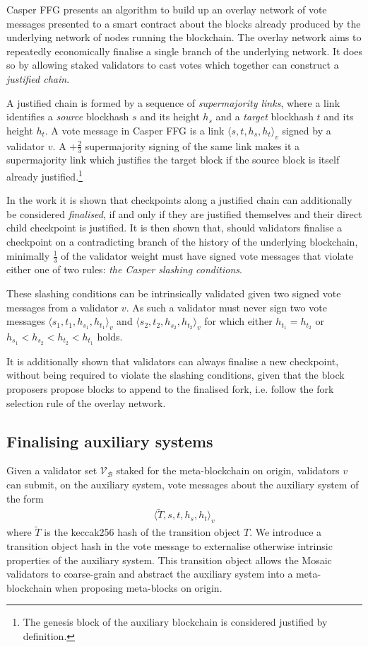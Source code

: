 \documentclass[12pt,a4paper]{article}
\begin{document}
Casper FFG presents an algorithm to build up an overlay network of vote messages presented to a smart contract about the blocks already produced by the underlying network of nodes running the blockchain.
The overlay network aims to repeatedly economically finalise a single branch of the underlying network.
It does so by allowing staked validators to cast votes which together can construct a \emph{justified chain}.

A justified chain is formed by a sequence of \emph{supermajority links}, where a link identifies a \emph{source} blockhash $s$ and its height $h_s$ and a \emph{target} blockhash $t$ and its height $h_t$.
A vote message in Casper FFG is a link $\langle s, t, h_s, h_t\rangle_v$ signed by a validator $v$.
A $+\tfrac{2}{3}$ supermajority signing of the same link makes it a supermajority link which justifies the target block if the source block is itself already justified.\footnote{
	The genesis block of the auxiliary blockchain is considered justified by definition.
}

In the work it is shown that checkpoints along a justified chain can additionally be considered \emph{finalised}, if and only if they are justified themselves and their direct child checkpoint is justified.
It is then shown that, should validators finalise a checkpoint on a contradicting branch of the history of the underlying blockchain, minimally $\tfrac{1}{3}$ of the validator weight must have signed vote messages that violate either one of two rules: \emph{the Casper slashing conditions}.

These slashing conditions can be intrinsically validated given two signed vote messages from a validator $v$.
As such a validator must never sign two vote messages $\langle s_1, t_1, h_{s_1}, h_{t_1}\rangle_v$ and $\langle s_2, t_2, h_{s_2}, h_{t_2}\rangle_v$ for which either $h_{t_1} = h_{t_2}$ or $h_{s_1} < h_{s_2} < h_{t_2} < h_{t_1}$ holds.

It is additionally shown that validators can always finalise a new checkpoint, without being required to violate the slashing conditions, given that the block proposers propose blocks to append to the finalised fork, i.e. follow the fork selection rule of the overlay network.

\subsection{Finalising auxiliary systems}
Given a validator set $\mathcal{V}_\mathcal{B}$ staked for the meta-blockchain on origin, validators $v$ can submit, on the auxiliary system, vote messages about the auxiliary system of the form
\begin{align}\label{externalisedvote}
  \langle \tilde{T}, s, t, h_s, h_t \rangle_v
\end{align}
where $\tilde{T}$ is the keccak256 hash of the transition object $T$.
We introduce a transition object hash in the vote message to externalise otherwise intrinsic properties of the auxiliary system.
This transition object allows the Mosaic validators to coarse-grain and abstract the auxiliary system into a meta-blockchain when proposing meta-blocks on origin.
\end{document}
